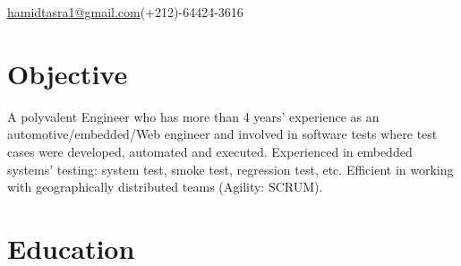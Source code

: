 \documentclass{my_cv}
\begin{document}
 {\href{mailto:hamidtasra1@gmail.com}{hamidtasra1@gmail.com}}{(+212)-64424-3616}


\section{Objective}
\hspace{1pt}\parbox{0.99\textwidth}{
A polyvalent Engineer who has more than 4 years’ experience as an automotive/embedded/Web engineer and 
involved in software tests where test cases were developed, automated and 
executed. Experienced in embedded systems’ testing: system test, smoke test, 
regression test, etc. Efficient in working with geographically distributed 
teams (Agility: SCRUM).
}

\vspace{-7pt}

\section{Education}

\\
\vspace{3pt}
 \\



\vspace{-7pt}
\end{document}
